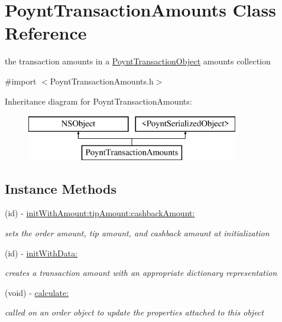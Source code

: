\hypertarget{interface_poynt_transaction_amounts}{}\section{Poynt\+Transaction\+Amounts Class Reference}
\label{interface_poynt_transaction_amounts}


the transaction amounts in a \hyperlink{interface_poynt_transaction_object}{Poynt\+Transaction\+Object} amounts collection  




{\ttfamily \#import $<$Poynt\+Transaction\+Amounts.\+h$>$}

Inheritance diagram for Poynt\+Transaction\+Amounts\+:\begin{figure}[H]
\begin{center}
\leavevmode
\includegraphics[height=2.000000cm]{interface_poynt_transaction_amounts}
\end{center}
\end{figure}
\subsection*{Instance Methods}
\begin{DoxyCompactItemize}
\item 
(id) -\/ \hyperlink{interface_poynt_transaction_amounts_af1bc93b54ea2b50650a15f84ced4f921}{init\+With\+Amount\+:tip\+Amount\+:cashback\+Amount\+:}
\begin{DoxyCompactList}\small\item\em sets the order amount, tip amount, and cashback amount at initialization \end{DoxyCompactList}\item 
(id) -\/ \hyperlink{interface_poynt_transaction_amounts_ac4a96ce3f50982e0f88ef099c2b3dc5b}{init\+With\+Data\+:}
\begin{DoxyCompactList}\small\item\em creates a transaction amount with an appropriate dictionary representation \end{DoxyCompactList}\item 
(void) -\/ \hyperlink{interface_poynt_transaction_amounts_a1c43473c035627846e64fddfb2bbe57d}{calculate\+:}
\begin{DoxyCompactList}\small\item\em called on an order object to update the properties attached to this object \end{DoxyCompactList}\end{DoxyCompactItemize}
